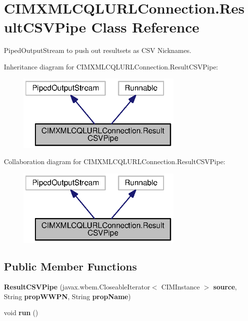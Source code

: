 \section{C\+I\+M\+X\+M\+L\+C\+Q\+L\+U\+R\+L\+Connection.\+Result\+C\+S\+V\+Pipe Class Reference}
\label{classorg_1_1smallfoot_1_1parser_1_1cimcql_1_1CIMXMLCQLURLConnection_1_1ResultCSVPipe}


Piped\+Output\+Stream to push out resultsets as C\+S\+V Nicknames.  




Inheritance diagram for C\+I\+M\+X\+M\+L\+C\+Q\+L\+U\+R\+L\+Connection.\+Result\+C\+S\+V\+Pipe\+:\nopagebreak
\begin{figure}[H]
\begin{center}
\leavevmode
\includegraphics[width=232pt]{classorg_1_1smallfoot_1_1parser_1_1cimcql_1_1CIMXMLCQLURLConnection_1_1ResultCSVPipe__inherit__graph}
\end{center}
\end{figure}


Collaboration diagram for C\+I\+M\+X\+M\+L\+C\+Q\+L\+U\+R\+L\+Connection.\+Result\+C\+S\+V\+Pipe\+:\nopagebreak
\begin{figure}[H]
\begin{center}
\leavevmode
\includegraphics[width=232pt]{classorg_1_1smallfoot_1_1parser_1_1cimcql_1_1CIMXMLCQLURLConnection_1_1ResultCSVPipe__coll__graph}
\end{center}
\end{figure}
\subsection*{Public Member Functions}
\begin{DoxyCompactItemize}
\item 
{\bf Result\+C\+S\+V\+Pipe} (javax.\+wbem.\+Closeable\+Iterator$<$ C\+I\+M\+Instance $>$ {\bf source}, String {\bf prop\+W\+W\+P\+N}, String {\bf prop\+Name})
\item 
void {\bf run} ()
\end{DoxyCompactItemize}
